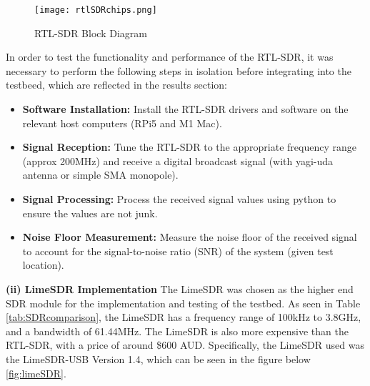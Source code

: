 \begin{figure}[htbp]
    \centering
    \texttt{[image: rtlSDRchips.png]}
    \caption{RTL-SDR Block Diagram \cite{RTLsdrBlockDiagram}}
    \label{fig:rtlSDRblock}
\end{figure}

\par \noindent
In order to test the functionality and performance of the RTL-SDR, it was necessary to perform the following steps in isolation before integrating into the testbeed, which are reflected in the results section:
\begin{itemize}
    \item \textbf{Software Installation:} Install the RTL-SDR drivers and software on the relevant host computers (RPi5 and M1 Mac).
    \item \textbf{Signal Reception:} Tune the RTL-SDR to the appropriate frequency range (approx 200MHz) and receive a digital broadcast signal (with yagi-uda antenna or simple SMA monopole).
    \item \textbf{Signal Processing:} Process the received signal values using python to ensure the values are not junk.
    \item \textbf{Noise Floor Measurement:} Measure the noise floor of the received signal to account for the signal-to-noise ratio (SNR) of the system (given test location).
\end{itemize}

\vspace{0.5cm} \noindent 
\textbf{(ii) LimeSDR Implementation}
The LimeSDR was chosen as the higher end SDR module for the implementation and testing of the testbed. As seen in Table \ref{tab:SDRcomparison}, the LimeSDR has a frequency range of 100kHz to 3.8GHz, and a bandwidth of 61.44MHz. The LimeSDR is also more expensive than the RTL-SDR, with a price of around \$600 AUD. Specifically, the LimeSDR used was the LimeSDR-USB Version 1.4, which can be seen in the figure below \ref{fig:limeSDR}. 

